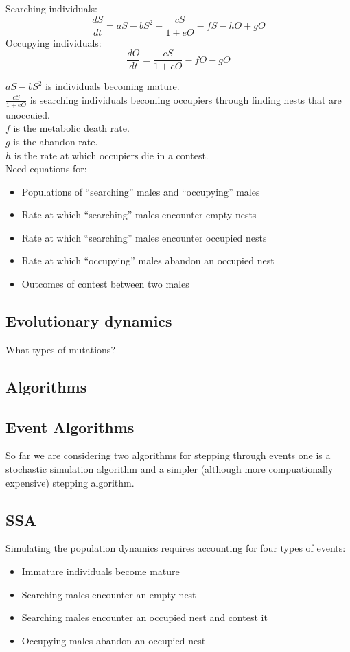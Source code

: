 \documentclass[a4paper,11pt]{article}
\begin{document}
Searching individuals:
\begin{equation} \label{eq:searching}
    \frac{dS}{dt} = aS - bS^2 - \frac{cS}{1+eO} - fS - hO + gO
\end{equation}
Occupying individuals:
\begin{equation} \label{eq:occupying}
    \frac{dO}{dt} = \frac{cS}{1+eO} - fO - gO
\end{equation}

$aS - bS^2$ is individuals becoming mature.\\
$\frac{cS}{1+eO}$ is searching individuals becoming occupiers through finding nests that are unoccuied.\\
$f$ is the metabolic death rate.\\
$g$ is the abandon rate.\\
$h$ is the rate at which occupiers die in a contest.\\

Need equations for:
\begin{itemize}
    \item Populations of ``searching'' males and  ``occupying'' males
    \item Rate at which ``searching'' males encounter empty nests
    \item Rate at which ``searching'' males encounter occupied nests
    \item Rate at which ``occupying'' males abandon an occupied nest
    \item Outcomes of contest between two males
\end{itemize}

\subsection{Evolutionary dynamics}

What types of mutations?

\subsection{Algorithms}
\subsection{Event Algorithms}
So far we are considering two algorithms for stepping through events one is a stochastic simulation algorithm and a simpler (although more compuationally expensive) stepping algorithm.
\subsection{SSA}
Simulating the population dynamics requires accounting for four types of events:
\begin{itemize}
    \item Immature individuals become mature
    \item Searching males encounter an empty nest
    \item Searching males encounter an occupied nest and contest it
    \item Occupying males abandon an occupied nest
\end{itemize}
\end{document}
